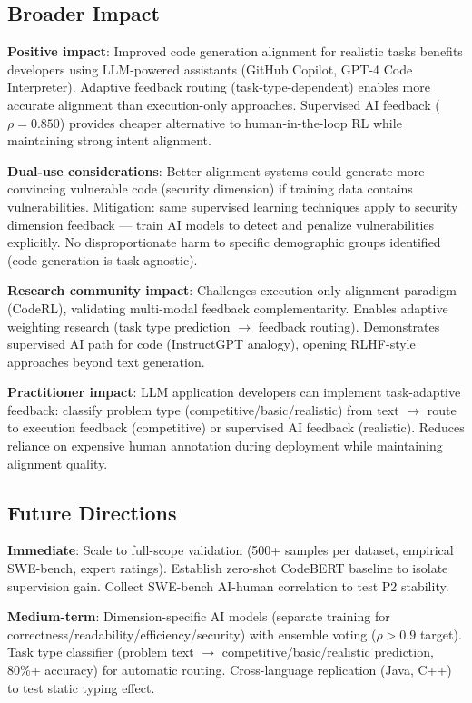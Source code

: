 \subsection{Broader Impact}

\textbf{Positive impact}: Improved code generation alignment for realistic tasks benefits developers using LLM-powered assistants (GitHub Copilot, GPT-4 Code Interpreter). Adaptive feedback routing (task-type-dependent) enables more accurate alignment than execution-only approaches. Supervised AI feedback ($\rho=0.850$) provides cheaper alternative to human-in-the-loop RL while maintaining strong intent alignment.

\textbf{Dual-use considerations}: Better alignment systems could generate more convincing vulnerable code (security dimension) if training data contains vulnerabilities. Mitigation: same supervised learning techniques apply to security dimension feedback --- train AI models to detect and penalize vulnerabilities explicitly. No disproportionate harm to specific demographic groups identified (code generation is task-agnostic).

\textbf{Research community impact}: Challenges execution-only alignment paradigm (CodeRL), validating multi-modal feedback complementarity. Enables adaptive weighting research (task type prediction $\rightarrow$ feedback routing). Demonstrates supervised AI path for code (InstructGPT analogy), opening RLHF-style approaches beyond text generation.

\textbf{Practitioner impact}: LLM application developers can implement task-adaptive feedback: classify problem type (competitive/basic/realistic) from text $\rightarrow$ route to execution feedback (competitive) or supervised AI feedback (realistic). Reduces reliance on expensive human annotation during deployment while maintaining alignment quality.

\subsection{Future Directions}

\textbf{Immediate}: Scale to full-scope validation (500+ samples per dataset, empirical SWE-bench, expert ratings). Establish zero-shot CodeBERT baseline to isolate supervision gain. Collect SWE-bench AI-human correlation to test P2 stability.

\textbf{Medium-term}: Dimension-specific AI models (separate training for correctness/readability/efficiency/security) with ensemble voting ($\rho>0.9$ target). Task type classifier (problem text $\rightarrow$ competitive/basic/realistic prediction, 80\%+ accuracy) for automatic routing. Cross-language replication (Java, C++) to test static typing effect.

